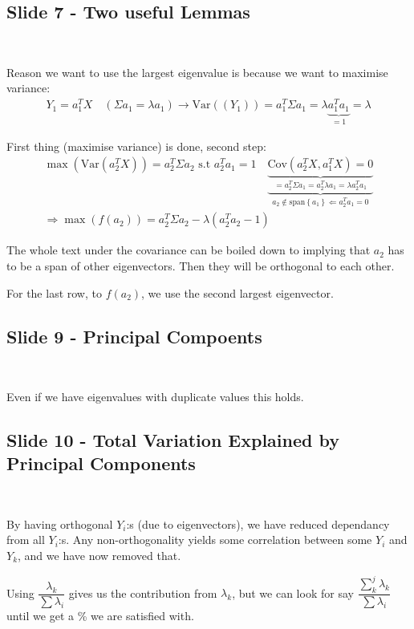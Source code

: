\subsection{Slide 7 - Two useful Lemmas}\hfill\\\par
\noindent Reason we want to use the largest eigenvalue is because we want to maximise variance:
\begin{equation*}
  \begin{gathered}
    Y_1 = a_1^TX\quad (\Sigma a_1=\lambda a_1)\rightarrow \text{Var}\left((Y_1)\right) = a_1^T\Sigma a_1 = \lambda\underbrace{ a_1^Ta_1}_{\text{$=1$}} = \lambda
  \end{gathered}
\end{equation*}\par
\noindent First thing (maximise variance) is done, second step:
\begin{equation*}
  \begin{gathered}
    \max(\text{Var}\left(a_2^TX\right)) = a_2^T\Sigma a_2\text{ s.t } a_2^Ta_1 = 1\quad\underbrace{\underbrace{\text{Cov}\left(a_2^TX,a_1^TX\right) = 0}_{= a_2^T\Sigma a_1 = a_2^T\lambda a_1 = \lambda a_2^Ta_1}}_{a_2\not\in\text{span}\left\{a_1\right\}\Leftarrow a_2^Ta_1=0}\\
    \Rightarrow \max(f(a_2)) = a_2^T\Sigma a_2 -\lambda (a_2^Ta_2-1)
  \end{gathered}
\end{equation*}\par
\noindent The whole text under the covariance can be boiled down to implying that $a_2$ has to be a span of other eigenvectors. Then they will be orthogonal to each other. \par
\noindent For the last row, to $f(a_2)$, we use the second largest eigenvector.
\par\bigskip
\subsection{Slide 9 - Principal Compoents}\hfill\\\par
\noindent Even if we have eigenvalues with duplicate values this holds.
\par\bigskip
\subsection{Slide 10 - Total Variation Explained by Principal Components}\hfill\\\par
\noindent By having orthogonal $Y_i$:s (due to eigenvectors), we have reduced dependancy from all $Y_i$:s. Any non-orthogonality yields some correlation between some $Y_i$ and $Y_k$, and we have now removed that.
\par\bigskip
\noindent Using $\dfrac{\lambda_k}{\sum \lambda_i}$ gives us the contribution from $\lambda_k$, but we can look for say $\dfrac{\sum_{k}^{j}\lambda_k}{\sum \lambda_i}$ until we get a \% we are satisfied with. 
\par\bigskip
